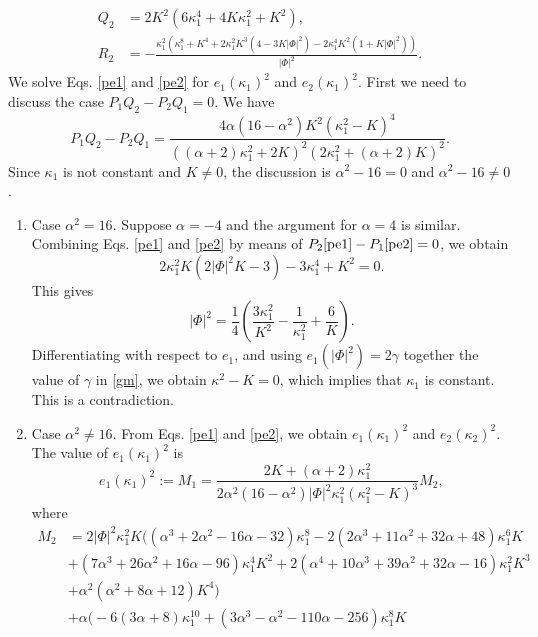 \documentclass[a4paper,12pt]{amsart}
\theoremstyle{definition}
\begin{document}
\begin{enumerate}
\begin{equation*}
\begin{split}
Q_2&= 2K^2(6\kappa_1^4+4K  \kappa_1^2+K^2),\\
R_2&=-\frac{\kappa_1^2 \left(\kappa_1^8 +K^4+2\kappa_1^2 K^3(4-3K|\Phi|^2)-2\kappa_1^4K^2(1+K|\Phi|^2)\right)}{|\Phi|^2}.
\end{split}
\end{equation*}
We solve Eqs. \eqref{pe1} and \eqref{pe2} for $e_1(\kappa_1)^2$ and $e_2(\kappa_1)^2$. First we need to discuss the case $P_1Q_2-P_2 Q_1=0$. We have  
$$P_1Q_2-P_2 Q_1=\frac{4 \alpha  \left(16-\alpha ^2\right) K^2 \left(\kappa_1^2-K\right)^4}{\left((\alpha +2) \kappa_1^2+2 K\right)^2 \left(2 \kappa_1^2+(\alpha +2) K\right)^2}.$$
Since $\kappa_1$ is not constant and $K\not=0$, the discussion is   $\alpha^2-16=0$ and $\alpha^2-16\not=0$.
\begin{enumerate}
\item Case $\alpha^2=16$. Suppose $\alpha=-4$ and the argument for $\alpha=4$ is similar. Combining Eqs. \eqref{pe1} and \eqref{pe2} by means of $P_2\eqref{pe1}-P_1 \eqref{pe2}=0$, we obtain 
$$2 \kappa_1^2 K \left(2 |\Phi|^2 K-3\right)-3 \kappa_1^4+K^2=0.$$
This gives 
$$|\Phi|^2=\frac{1}{4} \left(\frac{3 \kappa_1^2}{K^2}-\frac{1}{\kappa_1^2}+\frac{6}{K}\right).$$
Differentiating with respect to $e_1$, and using $e_1(|\Phi|^2)=2\gamma$ together the value of $\gamma$ in \eqref{gm}, we obtain 
$\kappa^2-K=0$, which implies that   $\kappa_1$ is constant. This is  a contradiction.
\item Case $\alpha^2 \not=16$. From Eqs. \eqref{pe1} and \eqref{pe2}, we obtain $e_1(\kappa_1)^2$ and $e_2(\kappa_2)^2$. The value of $e_1(\kappa_1)^2$ is 
\begin{equation}\label{E2}
e_1(\kappa_1)^2:=M_1=\frac{2K+(\alpha +2)\kappa_1^2}{2\alpha^2(16-\alpha^2)|\Phi|^2\kappa_1^2(\kappa_1^2-K)^3}M_2,
\end{equation}
where
\begin{equation*}
\begin{split}
M_2&=2 |\Phi|^2 \kappa_1^2 K \Big(\left(\alpha ^3+2 \alpha ^2-16 \alpha -32\right) \kappa_1^8-2 \left(2 \alpha ^3+11 \alpha ^2+32 \alpha +48\right) \kappa_1^6 K\\
&+\left(7 \alpha ^3+26 \alpha ^2+16 \alpha -96\right) \kappa_1^4 K^2+2 \left(\alpha ^4+10 \alpha ^3+39 \alpha ^2+32 \alpha -16\right) \kappa_1^2 K^3\\
&+\alpha ^2 \left(\alpha ^2+8 \alpha +12\right) K^4\Big)\\
&+\alpha  \Big(-6 (3 \alpha +8) \kappa_1^{10}+\left(3 \alpha ^3-\alpha ^2-110 \alpha -256\right) \kappa_1^8 K\\

\end{split}
\end{equation*}
\end{enumerate}
\end{enumerate}
\end{document}

